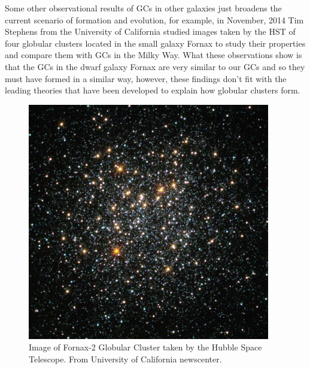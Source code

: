 Some other observational results of GCs in other galaxies just broadens the current scenario of formation and evolution, for example, in November, 2014 Tim Stephens from the University of California studied images taken by the HST of four globular clusters located in the small galaxy Fornax to study their properties and compare them with GCs in the Milky Way. What these observations show is that the GCs in the dwarf galaxy Fornax are very similar to our GCs and so they must have formed in a similar way, however, these findings don't fit with the leading theories that have been developed to explain how globular clusters form.   

\begin{figure}[H]
  \centering
  \begin{minipage}[b]{0.45\textwidth}
    \includegraphics[width=\textwidth]{images/fornax-2-400.jpg}
    \caption[Hubble image of Fornax-2 Globular Cluster]{Image of Fornax-2 Globular Cluster taken by the Hubble Space Telescope. From University of California newscenter.}
  \end{minipage}
  \hfill
  \begin{minipage}[b]{0.45\textwidth}

\end{minipage}
\end{figure}
